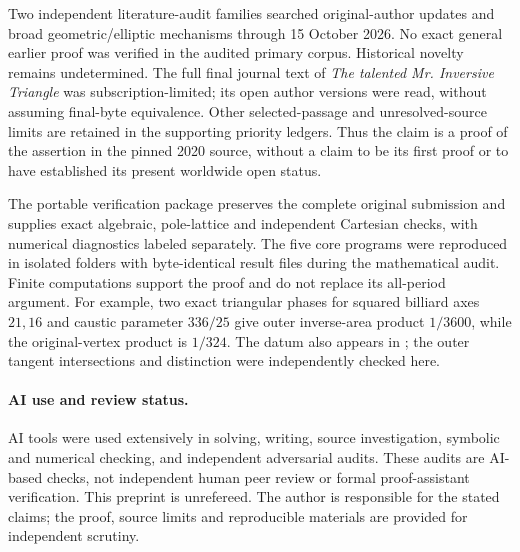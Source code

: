 \documentclass[11pt]{article}
\begin{document}
Two independent literature-audit families searched original-author updates and broad geometric/elliptic mechanisms through 15 October 2026. No exact general earlier proof was verified in the audited primary corpus. Historical novelty remains undetermined. The full final journal text of \emph{The talented Mr. Inversive Triangle} was subscription-limited; its open author versions were read, without assuming final-byte equivalence. Other selected-passage and unresolved-source limits are retained in the supporting priority ledgers. Thus the claim is a proof of the assertion in the pinned 2020 source, without a claim to be its first proof or to have established its present worldwide open status.

The portable verification package preserves the complete original submission and supplies exact algebraic, pole-lattice and independent Cartesian checks, with numerical diagnostics labeled separately. The five core programs were reproduced in isolated folders with byte-identical result files during the mathematical audit. Finite computations support the proof and do not replace its all-period argument. For example, two exact triangular phases for squared billiard axes $21,16$ and caustic parameter $336/25$ give outer inverse-area product $1/3600$, while the original-vertex product is $1/324$. The datum also appears in \cite{Ferudun}; the outer tangent intersections and distinction were independently checked here.

\paragraph{AI use and review status.}
AI tools were used extensively in solving, writing, source investigation, symbolic and numerical checking, and independent adversarial audits. These audits are AI-based checks, not independent human peer review or formal proof-assistant verification. This preprint is unrefereed. The author is responsible for the stated claims; the proof, source limits and reproducible materials are provided for independent scrutiny.
\end{document}
